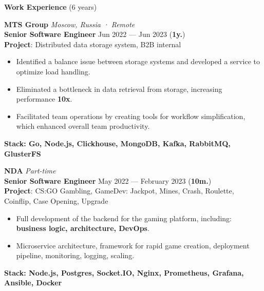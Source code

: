 \documentclass{resume}
\begin{document}
\begin{rSection}{\textbf{Work Experience} (6 years) }

\textbf{MTS Group} \hfill \textit{Moscow, Russia · Remote} \\
\textbf{Senior Software Engineer}  \hfill Jun 2022 --- Jun 2023 ({\textbf{1y.}}) \\
\textbf{Project}: Distributed data storage system, B2B internal
\begin{itemize}
    \setlength\itemsep{-0.4em}
    \item Identified a balance issue between storage systems and developed a service to optimize load handling\@.
    \item Eliminated a bottleneck in data retrieval from storage, increasing performance \textbf{10x}\@.
    \item Facilitated team operations by creating tools for workflow simplification, which enhanced overall team productivity\@.
\end{itemize}
\textbf{Stack: Go, Node.js, Clickhouse, MongoDB, Kafka, RabbitMQ, GlusterFS}

\textbf{NDA} \hfill \textit{Part-time} \\
\textbf{Senior Software Engineer}  \hfill May 2022 --- February 2023 ({\textbf{10m.}}) \\
\textbf{Project}: CS:GO Gambling, GameDev: Jackpot, Mines, Crash, Roulette, Coinflip, Case Opening, Upgrade
\begin{itemize}
    \item Full development of the backend for the gaming platform, including: \textbf{business logic, architecture, DevOps}\@.
    \item Microservice architecture, framework for rapid game creation, deployment pipeline, monitoring, logging, scaling\@.
\end{itemize}
\textbf{Stack: Node.js, Postgres, Socket.IO, Nginx, Prometheus, Grafana, Ansible, Docker}


\end{rSection}
\end{document}
